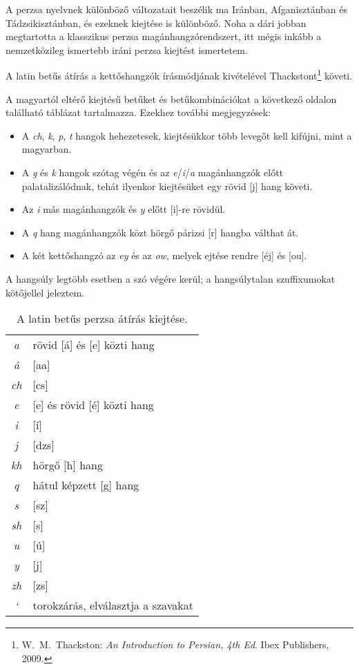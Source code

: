 A perzsa nyelvnek különböző változatait beszélik ma Iránban,
Afganisztánban és Tádzsikisztánban, és ezeknek kiejtése is
különböző. Noha a dári jobban megtartotta a klasszikus perzsa
magánhangzórendszert, itt mégis inkább a nemzetközileg ismertebb iráni
perzsa kiejtést ismertetem.

A latin betűs átírás a kettőshangzók írásmódjának kivételével
Thackstont\footnote{W.~M.~Thackston: \emph{An Introduction to Persian,
    4th Ed}. Ibex Publishers, 2009.} követi.

A magyartól eltérő kiejtésű betűket és betűkombinációkat a következő
oldalon található táblázat tartalmazza. Ezekhez további megjegyzések:

\begin{itemize}
  \item A \emph{ch}, \emph{k}, \emph{p}, \emph{t} hangok hehezetesek,
    kiejtésükkor több levegőt kell kifújni, mint a magyarban.
  \item A \emph{g} és \emph{k} hangok szótag végén és az
    \emph{e}/\emph{i}/\emph{a} magánhangzók előtt palatalizálódnak,
    tehát ilyenkor kiejtésüket egy rövid [j] hang követi.
  \item Az \emph{i} más magánhangzók és \emph{y} előtt [i]-re rövidül.
  \item A \emph{q} hang magánhangzók közt hörgő párizsi [r] hangba
    válthat át.
  \item A két kettőshangzó az \emph{ey} és az \emph{ow}, melyek ejtése
    rendre [éj] és [ou].
\end{itemize}

A hangsúly legtöbb esetben a szó végére kerül; a hangsúlytalan
szuffixumokat kötőjellel jeleztem.

\begin{table}[h]
  \begin{center}
    \smallskip\smallskip
    \begin{tabular}{cl}
      \emph{a} & rövid [á] és [e] közti hang\\
      \emph{â} & [aa]\\
      \emph{ch} & [cs]\\
      \emph{e} & [e] és rövid [é] közti hang\\
      \emph{i} & [í]\\
      \emph{j} & [dzs]\\
      \emph{kh} & hörgő [h] hang\\
      \emph{q} & hátul képzett [g] hang\\
      \emph{s} & [sz]\\
      \emph{sh} & [s]\\
      \emph{u} & [ú]\\
      \emph{y} & [j]\\
      \emph{zh} & [zs]\\
      \emph{`} & torokzárás, elválasztja a szavakat\\
    \end{tabular}
  \end{center}
  \caption{A latin betűs perzsa átírás kiejtése.}
\end{table}
